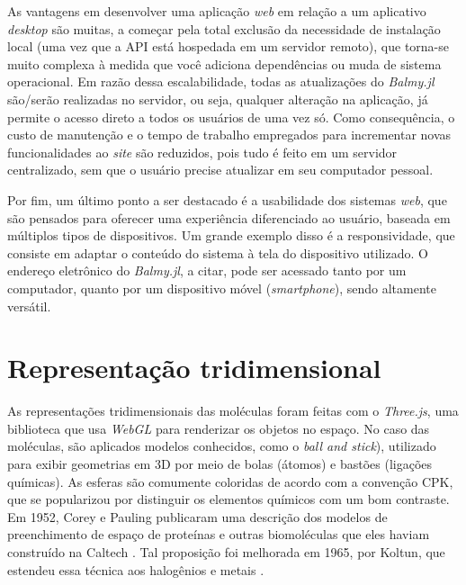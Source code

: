 As vantagens em desenvolver uma aplicação \textit{web} em relação a um aplicativo \textit{desktop} são muitas, a começar pela total exclusão da necessidade de instalação local (uma vez que a \gls{API} está hospedada em um servidor remoto), que torna-se muito complexa à medida que você adiciona dependências ou muda de sistema operacional. Em razão dessa escalabilidade, todas as atualizações do \textit{Balmy.jl} são/serão realizadas no servidor, ou seja, qualquer alteração na aplicação, já permite o acesso direto a todos os usuários de uma vez só. Como consequência, o custo de manutenção e o tempo de trabalho empregados para incrementar novas funcionalidades ao \textit{site} são reduzidos, pois tudo é feito em um servidor centralizado, sem que o usuário precise atualizar em seu computador pessoal.

Por fim, um último ponto a ser destacado é a usabilidade dos sistemas \textit{web}, que são pensados para oferecer uma experiência diferenciado ao usuário, baseada em múltiplos tipos de dispositivos. Um grande exemplo disso é a responsividade, que consiste em adaptar o conteúdo do sistema à tela do dispositivo utilizado. O endereço eletrônico do \textit{Balmy.jl}, a citar, pode ser acessado tanto por um computador, quanto por um dispositivo móvel (\textit{smartphone}), sendo altamente versátil.



\section{Representação tridimensional}\label{desenhoestrutural}

As representações tridimensionais das moléculas foram feitas com o \textit{Three.js}, uma biblioteca que usa \textit{WebGL} para renderizar os objetos no espaço. No caso das moléculas, são aplicados modelos conhecidos, como o \textit{ball and stick}), utilizado para exibir geometrias em 3D por meio de bolas (átomos) e bastões (ligações químicas). As esferas são comumente coloridas de acordo com a convenção \gls{CPK}, que se popularizou por distinguir os elementos químicos com um bom contraste. Em 1952, Corey e Pauling publicaram uma descrição dos modelos de preenchimento de espaço de proteínas e outras biomoléculas que eles haviam construído na Caltech \autocite{Corey1953}. Tal proposição foi melhorada em 1965, por Koltun, que estendeu essa técnica aos halogênios e metais \autocite{Crossland2004-ll}. 

